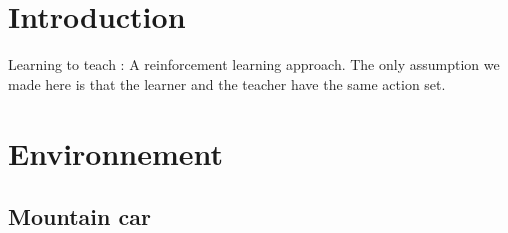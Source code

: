 \documentclass[a4paper,12pt]{article}
\begin{document}
  \begin{titlepage}
  \def\titletype{Experiments}
   \def\majortitle{Learning from expert}
   \def\docversion{1.1}
   
  \end{titlepage}

  
  \clearpage

  \tableofcontents
  

  \clearpage
  
  \renewcommand{\labelitemi}{$\bullet$}
  \renewcommand{\labelitemii}{$\circ$}
  \renewcommand{\labelitemiii}{$\diamond$}
  \renewcommand{\labelitemiv}{$\ast$}
  

  \section{Introduction}
  
  Learning to teach : A reinforcement learning approach.
  The only assumption we made here is that the learner and the teacher have the same action set.

  \clearpage
  \section{Environnement}
    \subsection{Mountain car}
\end{document}
